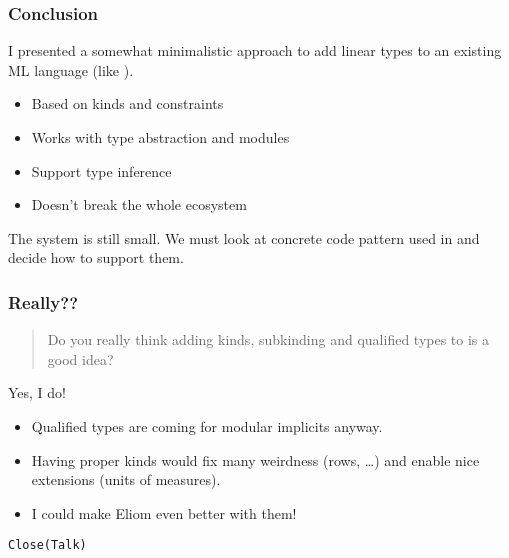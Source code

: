 \documentclass[xcolor=svgnames,11pt]{beamer}
\begin{document}
\begin{frame}
  \frametitle{Conclusion}

  I presented a somewhat minimalistic approach to add linear types to an existing ML language (like \ocaml).

  \begin{itemize}
  \item Based on kinds and constraints
  \item Works with type abstraction and modules
  \item Support type inference
  \item Doesn't break the whole ecosystem
  \end{itemize}

  The system is still small. We must look at concrete code pattern used in \ocaml and decide how to support them.
\end{frame}

\begin{frame}
  \frametitle{Really??}

  \begin{quote}
    Do you really think adding kinds, subkinding and qualified types to \ocaml is a good idea?
  \end{quote}\pause
  Yes, I do!\pause
  \begin{itemize}
  \item Qualified types are coming for modular implicits anyway.
  \item Having proper kinds would fix many weirdness (rows, \dots) and
    enable nice extensions (units of measures).\pause
  \item I could make Eliom even better with them! \smiley{}
  \end{itemize}
\end{frame}

\begin{frame}
  \Huge{\texttt{Close(Talk)}}
\end{frame}


\end{document}
